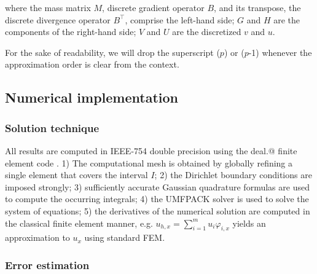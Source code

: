 \documentclass[review,3p]{elsarticle}
\makeatletter
\newcommand*{\rom}[1]{\expandafter\@slowromancap\romannumeral #1@}
\makeatother
\begin{document}
where the mass matrix $M$, discrete gradient operator $B$, and its transpose, the discrete divergence operator $B^\top$, comprise the left-hand side; $G$ and $H$ are the components of the right-hand side; $V$ and $U$ are the discretized $v$ and $u$.

For the sake of readability, we will drop the superscript ($p$) or ($p$-1) whenever the approximation order is clear
from the context.

\subsection{Numerical implementation}

\subsubsection{Solution technique}
All results are computed in IEEE-754 double precision \cite{zuras2008ieee} using the deal.\rom{2} finite element code \cite{alzetta2018deal}. 
1) The computational mesh is obtained by globally refining a single element that covers the interval $I$; 
2) the Dirichlet boundary conditions are imposed strongly;
3) sufficiently accurate Gaussian quadrature formulas are used to compute the occurring integrals;
4) the UMFPACK solver \cite{davis2004algorithm} is used to solve the system of equations;
5) the derivatives of the numerical solution are computed in the classical finite element manner, e.g. $u_{h,x}=\sum\limits _{i=1}^m u_i\varphi_{i,x}$ yields an approximation to $u_x$ using standard FEM. 

\subsubsection{Error estimation}
\end{document}

